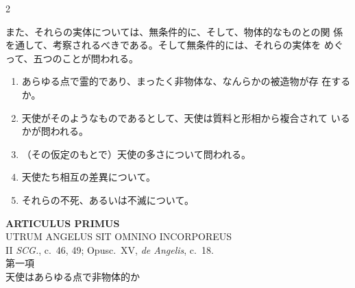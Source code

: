 \documentclass[paper=a4paper,fontsize=10pt,jafontsize=9pt,titlepage]{jlreq}
\begin{document}
\begin{paracol}{2}
\switchcolumn

また、それらの実体については、無条件的に、そして、物体的なものとの関
 係を通して、考察されるべきである。そして無条件的には、それらの実体を
 めぐって、五つのことが問われる。

\begin{enumerate}
 \item あらゆる点で霊的であり、まったく非物体な、なんらかの被造物が存
 在するか。
 \item 天使がそのようなものであるとして、天使は質料と形相から複合されて
       いるかが問われる。
 \item （その仮定のもとで）天使の多さについて問われる。
 \item 天使たち相互の差異について。
 \item それらの不死、あるいは不滅について。

\end{enumerate}

\end{paracol}

\newpage


{}
\setcounter{section}{1}
\setcounter{subsection}{0}
\begin{center}
 {\Large {\bfseries ARTICULUS PRIMUS}}\\
 {\large UTRUM ANGELUS SIT OMNINO INCORPOREUS}\\
 {\footnotesize II {\itshape SCG.}, c.~46, 49; Opusc.~XV, {\itshape de
 Angelis}, c.~18.}\\
 {\Large 第一項\\天使はあらゆる点で非物体的か}
\end{center}
\end{document}
